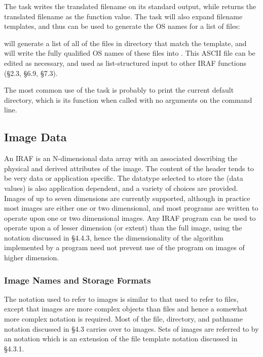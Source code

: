 \noindent
The  task writes the translated filename on its standard
output, while  returns the translated filename as the function
value.  The  task will also expand filename templates,
and thus can be used to generate the OS names for a list of files:

\begin{quotation}\noindent
{} 
\end{quotation}

\noindent
will generate a list of all of the files in directory 
that match the template, and will write the fully qualified OS names
of these files into .  This ASCII file can
be edited as necessary, and used as list-structured input to other
IRAF functions (\S 2.3, \S 6.9, \S 7.3).  

The most common use of the  task is probably to print
the current default directory, which is its function when called with no
arguments on the command line.

\subsection{Image Data}

\ppind
An IRAF  is an N-dimensional data array with an associated
 describing the physical and derived attributes of
the image.  The content of the header tends to be very data or application
specific.  The datatype selected to store the  (data values)
is also application dependent, and a variety of choices are provided.
Images of up to seven dimensions are currently supported, although
in practice most images are either one or two dimensional, and most programs
are written to operate upon one or two dimensional images.  Any IRAF program
can be used to operate upon a  of lesser dimension
(or extent) than the full image, using the  notation
discussed in \S 4.4.3, hence the dimensionality of the algorithm implemented
by a program need not prevent use of the program on images of higher dimension.

\subsubsection{Image Names and Storage Formats}

\ppind
The notation used to refer to images is similar to that used to refer to
files, except that images are more complex objects than files and hence a
somewhat more complex notation is required.  Most of the file, directory,
and pathname notation discussed in \S4.3 carries over to images.
Sets of images are referred to by an  notation
which is an extension of the file template notation discussed in \S4.3.1.

